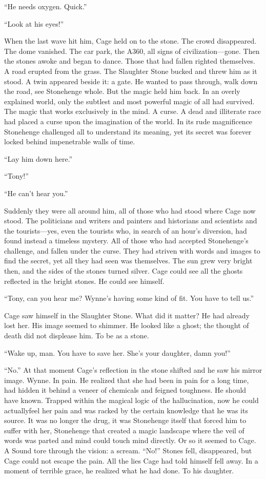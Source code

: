 “He needs oxygen. Quick.”

“Look at his eyes!”

When the last wave hit him, Cage held on to the stone. The crowd disappeared. The dome vanished. The car park, the A360, all signs of civilization—gone. Then the stones awoke and began to dance. Those that had fallen righted themselves. A road erupted from the grass. The Slaughter Stone bucked and threw him as it stood. A twin appeared beside it: a gate. He wanted to pass through, walk down the road, see Stonehenge whole. But the magic held him back. In an overly explained world, only the subtlest and most powerful magic of all had survived. The magic that works exclusively in the mind. A curse. A dead and illiterate race had placed a curse upon the imagination of the world. In its rude magnificence Stonehenge challenged all to understand its meaning, yet its secret was forever locked behind impenetrable walls of time.

“Lay him down here.”

“Tony!”

“He can’t hear you.”

Suddenly they were all around him, all of those who had stood where Cage now stood. The politicians and writers and painters and historians and scientists and the tourists—yes, even the tourists who, in search of an hour’s diversion, had found instead a timeless mystery. All of those who had accepted Stonehenge’s challenge, and fallen under the curse. They had striven with words and images to find the secret, yet all they had seen was themselves. The sun grew very bright then, and the sides of the stones turned silver. Cage could see all the ghosts reflected in the bright stones. He could see himself.

“Tony, can you hear me? Wynne’s having some kind of fit. You have to tell us.”

Cage saw himself in the Slaughter Stone. What did it matter? He had already lost her. His image seemed to shimmer. He looked like a ghost; the thought of death did not displease him. To be as a stone.

“Wake up, man. You have to save her. She’s your daughter, damn you!”

“No.” At that moment Cage’s reflection in the stone shifted and he saw his mirror image. Wynne. In pain. He realized that she had been in pain for a long time, had hidden it behind a veneer of chemicals and feigned toughness. He should have known. Trapped within the magical logic of the hallucination, now he could actuallyfeel her pain and was racked by the certain knowledge that he was its source. It was no longer the drug, it was Stonehenge itself that forced him to suffer with her, Stonehenge that created a magic landscape where the veil of words was parted and mind could touch mind directly. Or so it seemed to Cage. A Sound tore through the vision: a scream. “No!” Stones fell, disappeared, but Cage could not escape the pain. All the lies Cage had told himself fell away. In a moment of terrible grace, he realized what he had done. To his daughter.

